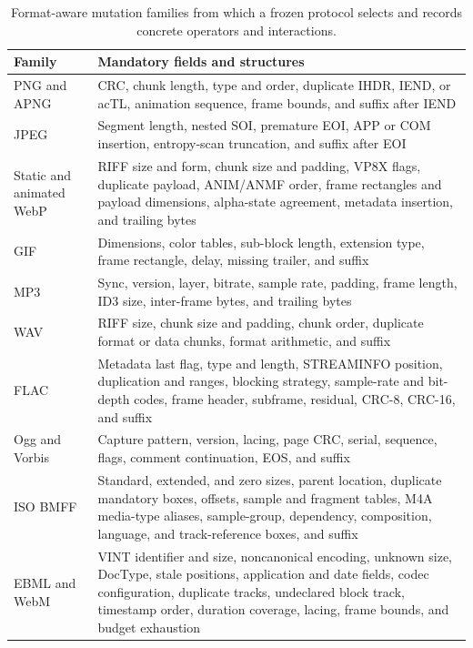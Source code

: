 \begin{table}[tbp]
\centering
\caption{Format-aware mutation families from which a frozen protocol selects
and records concrete operators and interactions.}
\label{tab:mutation-matrix}
\small
\begin{tabularx}{\textwidth}{L{0.17\textwidth}Y}
\toprule
Family & Mandatory fields and structures \\
\midrule
PNG and APNG & CRC, chunk length, type and order, duplicate IHDR, IEND, or acTL, animation sequence, frame bounds, and suffix after IEND \\
JPEG & Segment length, nested SOI, premature EOI, APP or COM insertion, entropy-scan truncation, and suffix after EOI \\
Static and animated WebP & RIFF size and form, chunk size and padding, VP8X flags, duplicate payload, ANIM/ANMF order, frame rectangles and payload dimensions, alpha-state agreement, metadata insertion, and trailing bytes \\
GIF & Dimensions, color tables, sub-block length, extension type, frame rectangle, delay, missing trailer, and suffix \\
MP3 & Sync, version, layer, bitrate, sample rate, padding, frame length, ID3 size, inter-frame bytes, and trailing bytes \\
WAV & RIFF size, chunk size and padding, chunk order, duplicate format or data chunks, format arithmetic, and suffix \\
FLAC & Metadata last flag, type and length, STREAMINFO position, duplication and ranges, blocking strategy, sample-rate and bit-depth codes, frame header, subframe, residual, CRC-8, CRC-16, and suffix \\
Ogg and Vorbis~\cite{rfc3533,vorbisI} & Capture pattern, version, lacing, page CRC, serial, sequence, flags, comment continuation, EOS, and suffix \\
ISO BMFF & Standard, extended, and zero sizes, parent location, duplicate mandatory boxes, offsets, sample and fragment tables, M4A media-type aliases, sample-group, dependency, composition, language, and track-reference boxes, and suffix \\
EBML and WebM~\cite{rfc8794,rfc9559,webmContainer} & VINT identifier and size, noncanonical encoding, unknown size, DocType, stale positions, application and date fields, codec configuration, duplicate tracks, undeclared block track, timestamp order, duration coverage, lacing, frame bounds, and budget exhaustion \\
\bottomrule
\end{tabularx}
\end{table}

